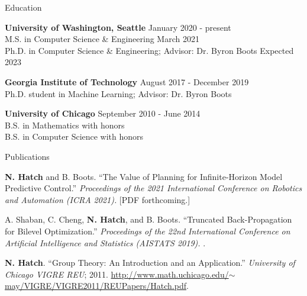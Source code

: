 \documentclass{resume} %
\begin{document}
\begin{rSection}{Education}

{\bf University of Washington, Seattle} \hfill {January 2020 - present} \\
M.S. in Computer Science \& Engineering \hfill March 2021 \\
Ph.D. in Computer Science \& Engineering; Advisor: Dr. Byron Boots \hfill Expected 2023

{\bf Georgia Institute of Technology} \hfill {August 2017 - December 2019} \\
Ph.D. student in Machine Learning; Advisor: Dr. Byron Boots

{\bf University of Chicago} \hfill {September 2010 - June 2014} \\
B.S. in Mathematics with honors \\
B.S. in Computer Science with honors

\end{rSection}

\begin{rSection}{Publications}

{\bf N. Hatch} and B. Boots. ``The Value of Planning for Infinite-Horizon Model Predictive Control.''
{\em Proceedings of the 2021 International Conference on Robotics and Automation (ICRA 2021).}
[PDF forthcoming.]

A. Shaban, C. Cheng, {\bf N. Hatch}, and B. Boots. ``Truncated Back-Propagation for Bilevel Optimization.''
{\em Proceedings of the 22nd International Conference on Artificial Intelligence and Statistics (AISTATS 2019).}
.

{\bf N. Hatch}. ``Group Theory: An Introduction and an Application.'' {\em University of Chicago VIGRE REU}; 2011.
\href{http://www.math.uchicago.edu/~may/VIGRE/VIGRE2011/REUPapers/Hatch.pdf}{http://www.math.uchicago.edu/$\sim$may/VIGRE/VIGRE2011/REUPapers/Hatch.pdf}.

\end{rSection}
\end{document}
